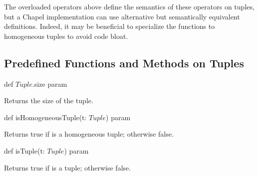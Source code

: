 \begin{note}
The overloaded operators above define the semantics of these operators
on tuples, but a Chapel implementation can use alternative but
semantically equivalent definitions.  Indeed, it may be beneficial to
specialize the functions to homogeneous tuples to avoid code bloat.
\end{note}

\subsection{Predefined Functions and Methods on Tuples}

\begin{protohead}
def $Tuple$.size param
\end{protohead}
\begin{protobody}
Returns the size of the tuple.
\end{protobody}

\begin{protohead}
def isHomogeneousTuple(t: $Tuple$) param
\end{protohead}
\begin{protobody}
Returns true if  is a homogeneous tuple; otherwise false.
\end{protobody}

\begin{protohead}
def isTuple(t: $Tuple$) param
\end{protohead}
\begin{protobody}
Returns true if  is a tuple; otherwise false.
\end{protobody}
